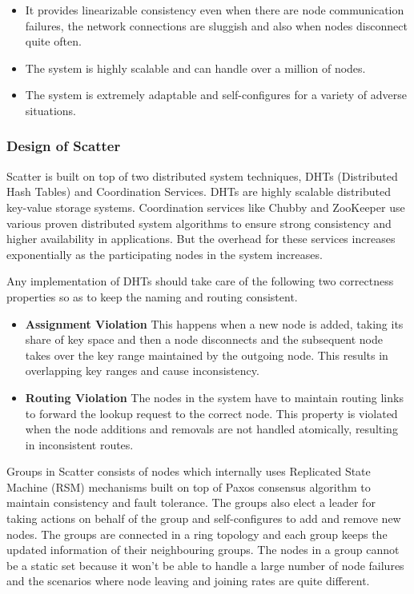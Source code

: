 \documentclass[11pt,a4paper]{article}
\begin{document}
    \begin{itemize}
        
        \item	It provides linearizable consistency even when there are node communication failures, the network connections are sluggish and also when nodes disconnect quite often.
        \item	The system is highly scalable and can handle over a million of nodes.
        \item	The system is extremely adaptable and self-configures for a variety of adverse situations.
    \end{itemize}
    
    \subsubsection{Design of Scatter}
    
    Scatter is built on top of two distributed system techniques, DHTs (Distributed Hash Tables) and Coordination Services. DHTs are highly scalable distributed key-value storage systems. Coordination services like Chubby \cite{ChubbyBurrows} and ZooKeeper \cite{ZooKeeperHunt} use various proven distributed system algorithms to ensure strong consistency and higher availability in applications. But the overhead for these services increases exponentially as the participating nodes in the system increases.
    
    
    
    Any implementation of DHTs should take care of the following two correctness properties so as to keep the naming and routing consistent.
    
    \begin{itemize}
        \item	\textbf{Assignment Violation} This happens when a new node is added, taking its share of key space and then a node disconnects and the subsequent node takes over the key range maintained by the outgoing node. This results in overlapping key ranges and cause inconsistency.
        \item	\textbf{Routing Violation} The nodes in the system have to maintain routing links to forward the lookup request to the correct node. This property is violated when the node additions and removals are not handled atomically, resulting in inconsistent routes.
    \end{itemize}
    
    Groups in Scatter consists of nodes which internally uses Replicated State Machine (RSM) mechanisms \cite{RSMSchneider} built on top of Paxos consensus algorithm \cite{PaxosLamport} to maintain consistency and fault tolerance. The groups also elect a leader for taking actions on behalf of the group and self-configures to add and remove new nodes. The groups are connected in a ring topology and each group keeps the updated information of their neighbouring groups. The nodes in a group cannot be a static set because it won’t be able to handle a large number of node failures and the scenarios where node leaving and joining rates are quite different.
    
\end{document}
